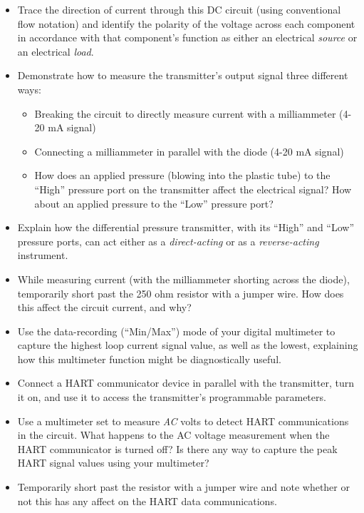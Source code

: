 \begin{itemize}
\item{} Trace the direction of current through this DC circuit (using conventional flow notation) and identify the polarity of the voltage across each component in accordance with that component's function as either an electrical {\it source} or an electrical {\it load}.
\vskip 10pt
\item{} Demonstrate how to measure the transmitter's output signal three different ways:
\begin{itemize}

\item{} Breaking the circuit to directly measure current with a milliammeter (4-20 mA signal)
\item{} Connecting a milliammeter in parallel with the diode (4-20 mA signal)
\vskip 10pt
\item{} How does an applied pressure (blowing into the plastic tube) to the ``High'' pressure port on the transmitter affect the electrical signal?  How about an applied pressure to the ``Low'' pressure port?
	\end{itemize}
\vskip 10pt
\item{} Explain how the differential pressure transmitter, with its ``High'' and ``Low'' pressure ports, can act either as a {\it direct-acting} or as a {\it reverse-acting} instrument.
\vskip 10pt
\item{} While measuring current (with the milliammeter shorting across the diode), temporarily short past the 250 ohm resistor with a jumper wire.  How does this affect the circuit current, and why?
\vskip 10pt
\item{} Use the data-recording (``Min/Max'') mode of your digital multimeter to capture the highest loop current signal value, as well as the lowest, explaining how this multimeter function might be diagnostically useful.
\vskip 10pt
\item{} Connect a HART communicator device in parallel with the transmitter, turn it on, and use it to access the transmitter's programmable parameters.
\vskip 10pt
\item{} Use a multimeter set to measure {\it AC} volts to detect HART communications in the circuit.  What happens to the AC voltage measurement when the HART communicator is turned off?  Is there any way to capture the peak HART signal values using your multimeter?
\vskip 10pt
\item{} Temporarily short past the resistor with a jumper wire and note whether or not this has any affect on the HART data communications.
\end{itemize}

